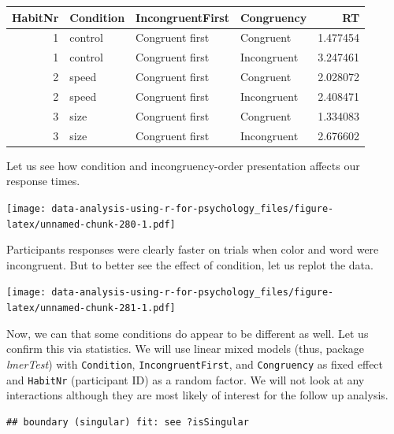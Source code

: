 \documentclass[
]{book}
\begin{document}
\begin{tabular}{r|l|l|l|r}
\hline
HabitNr & Condition & IncongruentFirst & Congruency & RT\\
\hline
1 & control & Congruent first & Congruent & 1.477454\\
\hline
1 & control & Congruent first & Incongruent & 3.247461\\
\hline
2 & speed & Congruent first & Congruent & 2.028072\\
\hline
2 & speed & Congruent first & Incongruent & 2.408471\\
\hline
3 & size & Congruent first & Congruent & 1.334083\\
\hline
3 & size & Congruent first & Incongruent & 2.676602\\
\hline
\end{tabular}

Let us see how condition and incongruency-order presentation affects our response times.

\texttt{[image: data-analysis-using-r-for-psychology\_files/figure-latex/unnamed-chunk-280-1.pdf]}

Participants responses were clearly faster on trials when color and word were incongruent. But to better see the effect of condition, let us replot the data.

\texttt{[image: data-analysis-using-r-for-psychology\_files/figure-latex/unnamed-chunk-281-1.pdf]}

Now, we can that some conditions do appear to be different as well. Let us confirm this via statistics. We will use linear mixed models (thus, package \emph{lmerTest}) with \texttt{Condition}, \texttt{IncongruentFirst}, and \texttt{Congruency} as fixed effect and \texttt{HabitNr} (participant ID) as a random factor. We will not look at any interactions although they are most likely of interest for the follow up analysis.

\begin{verbatim}
## boundary (singular) fit: see ?isSingular
\end{verbatim}
\end{document}
